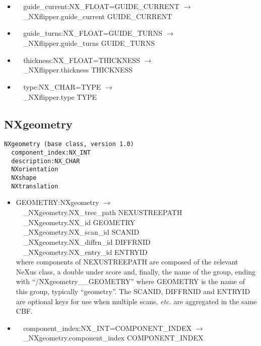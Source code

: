 \documentclass[11pt]{article}
\begin{document}
{{\begin{itemize}
\item{\verb|  |guide\_current:NX\_FLOAT=GUIDE\_CURRENT $\rightarrow$\\
\verb|  |\_NXflipper.guide\_current GUIDE\_CURRENT}

\item{\verb|  |guide\_turns:NX\_FLOAT=GUIDE\_TURNS $\rightarrow$\\
\verb|  |\_NXflipper.guide\_turns GUIDE\_TURNS}

\item{\verb|  |thickness:NX\_FLOAT=THICKNESS $\rightarrow$\\
\verb|  |\_NXflipper.thickness THICKNESS}

\item{\verb|  |type:NX\_CHAR=TYPE $\rightarrow$\\
\verb|  |\_NXflipper.type TYPE}
\end{itemize}
\subsection{NXgeometry}

\begin{verbatim}
NXgeometry (base class, version 1.0)
  component_index:NX_INT
  description:NX_CHAR
  NXorientation
  NXshape
  NXtranslation
\end{verbatim}

\begin{itemize}

\item{GEOMETRY:NXgeometry $\rightarrow$\\
\verb|  |\_NXgeometry.NX\_tree\_path    NEXUSTREEPATH \\
\verb|  |\_NXgeometry.NX\_id            GEOMETRY\\
\verb|  |\_NXgeometry.NX\_scan\_id      SCANID \\
\verb|  |\_NXgeometry.NX\_diffrn\_id    DIFFRNID \\
\verb|  |\_NXgeometry.NX\_entry\_id     ENTRYID \\
where components of NEXUSTREEPATH are composed of the
relevant NeXus class, a double under score and, finally, the
name of the group, ending with ``/NXgeometry\_\_GEOMETRY''
where GEOMETRY is the name of this group, typically ``geometry''.
The SCANID, DIFFRNID and ENTRYID are optional keys for use
when multiple scans, {\it etc.} are aggregated in the same CBF.}

\item{\verb|  |component\_index:NX\_INT=COMPONENT\_INDEX $\rightarrow$\\
\verb|  |\_NXgeometry.component\_index COMPONENT\_INDEX}


\end{itemize}}}
\end{document}
